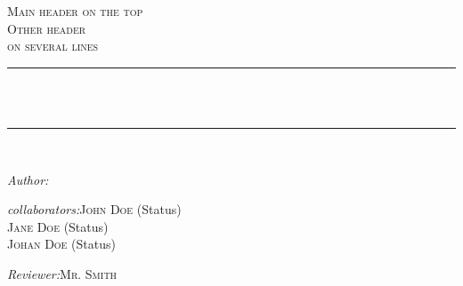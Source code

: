 

\newcommand{\Hline}[1][0.3]{\rule{\linewidth}{#1 mm}}


\begin{titlepage}
\enlargethispage{2cm}

  \begin{center}

    \textsc{\LARGE Main header on the top}\\[0.75cm]
    
    \textsc{\Large
    Other header\\[0.5cm]
    on several lines}\\[1.5cm]

    \Hline \\[0.4cm]
    { \huge \bfseries  \thetitle \\[0.4cm] }
	\Hline \\[0.6cm]

	
    \begin{minipage}[t]{0.30\textwidth}
      \begin{flushleft} \large
        \emph{Author:} \theauthor \\
      \end{flushleft}
    \end{minipage}
    \begin{minipage}[t]{0.65\textwidth}
      \begin{flushright}
      {\large
        \emph{collaborators:}\quad\textsc{John Doe} {\normalsize(Status)}\\
        \textsc{Jane Doe} {\normalsize(Status)}\\
        \textsc{Johan Doe} {\normalsize(Status)}\\
        \vspace{0.5cm}
        
        \emph{Reviewer:}\quad\textsc{Mr. Smith}\\
        \vspace{0.5cm}
        
}
\end{flushright}
\end{minipage}
\end{center}
\end{titlepage}
